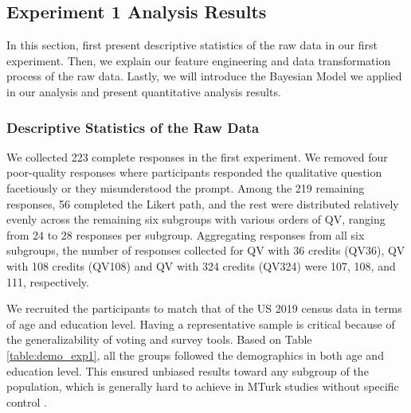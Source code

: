 \subsection{Experiment 1 Analysis Results} \label{results-1-quan}
In this section,  first present descriptive statistics  of the raw data in our first experiment.  Then, we explain our feature engineering  and data transformation process  of the raw data.  Lastly, we will introduce the Bayesian Model  we applied in our analysis  and present quantitative analysis results.

\subsubsection{Descriptive Statistics of the Raw Data}
    
We collected 223 complete responses in the first experiment.  We removed four poor-quality responses where participants responded the qualitative question facetiously  or they misunderstood the prompt.  Among the 219 remaining responses,  56 completed the Likert path,  and the rest were distributed relatively evenly  across the remaining six subgroups with various orders of QV,  ranging from 24 to 28 responses per subgroup.  Aggregating responses from all six subgroups,  the number of responses collected for QV with 36 credits (QV36),  QV with 108 credits (QV108) and QV with 324 credits (QV324)  were 107, 108, and 111, respectively. 

We recruited the participants  to match that of the US 2019 census data  in terms of age and education level.  Having a representative sample is critical because of the generalizability of voting and survey tools.  Based on Table \ref{table:demo_exp1},  all the groups followed the demographics in both age and education level.  This ensured unbiased results toward any subgroup of the population,  which is generally hard to achieve in MTurk studies without specific control \cite{difallah2018demographics}.


